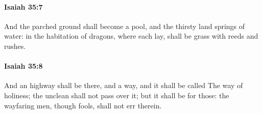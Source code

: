 		\paragraph{Isaiah 35:7} %
			\label{ISAIAH-35-7}

			And the parched ground shall become a pool, and the thirsty land springs of water: in the habitation of dragons, where each lay, shall be grass with reeds and rushes.


		\paragraph{Isaiah 35:8} %
			\label{ISAIAH-35-8}

			And an highway shall be there, and a way, and it shall be called The way of holiness; the unclean shall not pass over it; but it shall be for those: the wayfaring men, though fools, shall not err therein.



